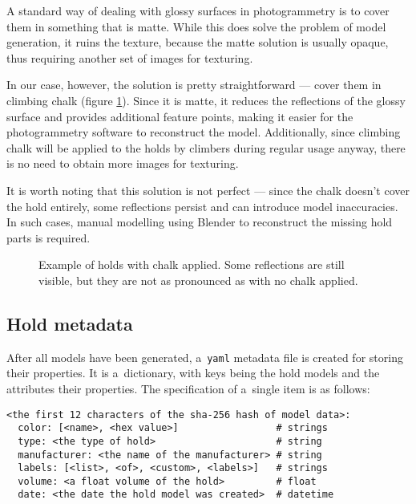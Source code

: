 A standard way of dealing with glossy surfaces in photogrammetry is to cover them in something that is matte.
While this does solve the problem of model generation, it ruins the texture, because the matte solution is usually opaque, thus requiring another set of images for texturing.

In our case, however, the solution is pretty straightforward --- cover them in climbing chalk (figure \ref{fig:chalk}).
Since it is matte, it reduces the reflections of the glossy surface and provides additional feature points, making it easier for the photogrammetry software to reconstruct the model.
Additionally, since climbing chalk will be applied to the holds by climbers during regular usage anyway, there is no need to obtain more images for texturing.

It is worth noting that this solution is not perfect --- since the chalk doesn't cover the hold entirely, some reflections persist and can introduce model inaccuracies.
In such cases, manual modelling using Blender \cite{blender} to reconstruct the missing hold parts is required.

\begin{figure}[t]
	\centering
	\hfill%
	\hfill%
	\caption{Example of holds with chalk applied. Some reflections are still visible, but they are not as pronounced as with no chalk applied.}%
	\label{fig:chalk}%
\end{figure}

\subsection{Hold metadata}
After all models have been generated, a~\verb|yaml| metadata file is created for storing their properties.
It is a~dictionary, with keys being the hold models and the attributes their properties.
The specification of a~single item is as follows:

\begin{verbatim}
<the first 12 characters of the sha-256 hash of model data>:
  color: [<name>, <hex value>]                 # strings
  type: <the type of hold>                     # string
  manufacturer: <the name of the manufacturer> # string
  labels: [<list>, <of>, <custom>, <labels>]   # strings
  volume: <a float volume of the hold>         # float
  date: <the date the hold model was created>  # datetime
\end{verbatim}

